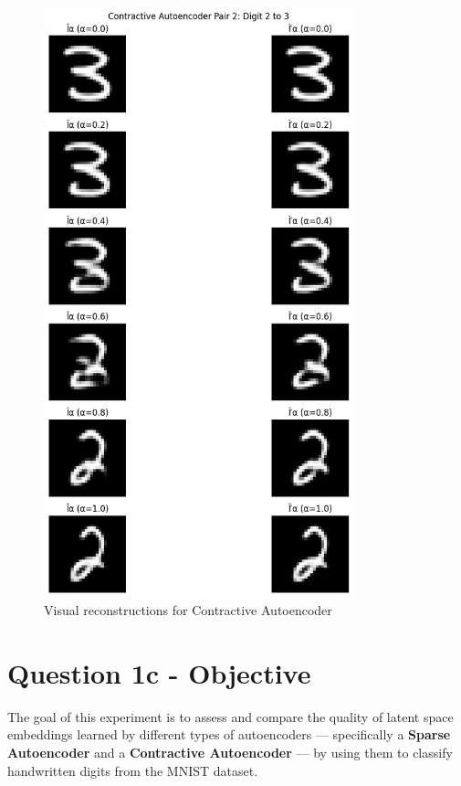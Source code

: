 \documentclass[12pt]{article}
\begin{document}
\begin{figure}
\centering
\includegraphics[width=0.8\textwidth,height=0.8\textheight,keepaspectratio]{IP_Contractive_Autoencoder_2.png}
\caption{Visual reconstructions for Contractive Autoencoder}
\end{figure}

\newpage
\section*{Question 1c - Objective}

The goal of this experiment is to assess and compare the quality of latent space embeddings learned by different types of autoencoders — specifically a \textbf{Sparse Autoencoder} and a \textbf{Contractive Autoencoder} — by using them to classify handwritten digits from the MNIST dataset.
\end{document}

